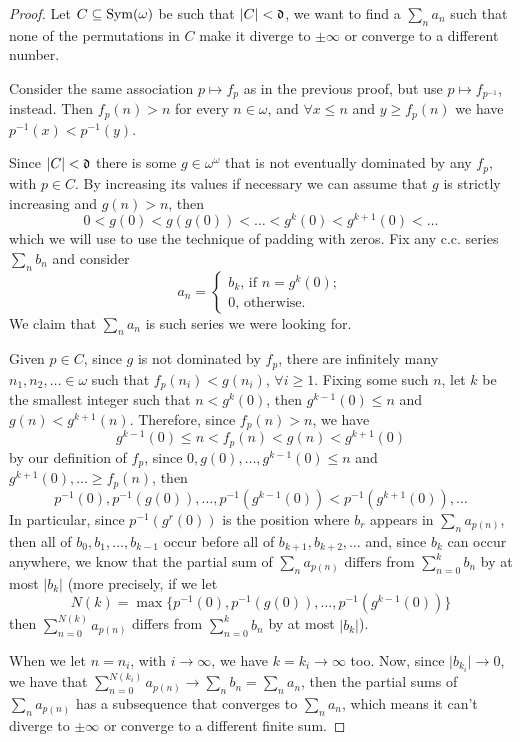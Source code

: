 \begin{proof}
    Let $C\subseteq\mathrm{Sym}(\omega)$ be such that $\lvert C\rvert<\mathfrak{d}$, we want to find a $\sum_n a_n$ such that none of the permutations in $C$ make it diverge to $\pm\infty$ or converge to a different number.

    Consider the same association $p\mapsto f_p$ as in the previous proof, but use $p\mapsto f_{p^{-1}}$, instead. Then $f_p(n)>n$ for every $n\in\omega$, and $\forall x \leq n$ and $y\geq f_p(n)$ we have $p^{-1}(x)<p^{-1}(y)$.

    Since $\lvert C\rvert<\mathfrak{d}$ there is some $g\in\omega^\omega$ that is not eventually dominated by any $f_p$, with $p\in C$. By increasing its values if necessary we can assume that $g$ is strictly increasing and $g(n)>n$, then
    $$0<g(0)<g(g(0))<\dots<g^k(0)<g^{k+1}(0)<\dots$$
    which we will use to use the technique of padding with zeros. Fix any c.c. series $\sum_n b_n$ and consider
    $$a_n=\begin{cases}
        b_k\text{, if }n=g^k(0);\\
        0\text{, otherwise}.
    \end{cases}$$
    We claim that $\sum_na_n$ is such series we were looking for.

    Given $p\in C$, since $g$ is not dominated by $f_p$, there are infinitely many $n_1,n_2,\dots\in\omega$ such that $f_p(n_i)<g(n_i)$, $\forall i\geq1$. Fixing some such $n$, let $k$ be the smallest integer such that $n<g^k(0)$, then $g^{k-1}(0)\leq n$ and $g(n)<g^{k+1}(n)$. Therefore, since $f_p(n)>n$, we have
    $$g^{k-1}(0)\leq n<f_p(n)<g(n)<g^{k+1}(0)$$
    by our definition of $f_p$, since $0,g(0),\dots,g^{k-1}(0)\leq n$ and $g^{k+1}(0),\dots\geq f_p(n)$, then
    $$p^{-1}(0),p^{-1}(g(0)),\dots,p^{-1}(g^{k-1}(0))<p^{-1}(g^{k+1}(0)),\dots$$
    In particular, since $p^{-1}(g^r(0))$ is the position where $b_r$ appears in $\sum_n a_{p(n)}$, then all of $b_0,b_1,\dots,b_{k-1}$ occur before all of $b_{k+1},b_{k+2},\dots$ and, since $b_k$ can occur anywhere, we know that the partial sum of $\sum_n a_{p(n)}$ differs from $\sum_{n=0}^kb_n$ by at most $\lvert b_k\rvert$ (more precisely, if we let
    $$N(k)=\max\{p^{-1}(0),p^{-1}(g(0)),\dots,p^{-1}(g^{k-1}(0))\}$$
    then $\sum_{n=0}^{N(k)}a_{p(n)}$ differs from $\sum_{n=0}^kb_n$ by at most $\lvert b_k\rvert$).
    
    When we let $n=n_i$, with $i\to\infty$, we have $k=k_i\to\infty$ too. Now, since $\lvert b_{k_i}\rvert\to0$, we have that $\sum_{n=0}^{N(k_i)}a_{p(n)}\to\sum_nb_n=\sum_na_n$, then the partial sums of $\sum_na_{p(n)}$ has a subsequence that converges to $\sum_na_n$, which means it can't diverge to $\pm\infty$ or converge to a different finite sum.
\end{proof}

